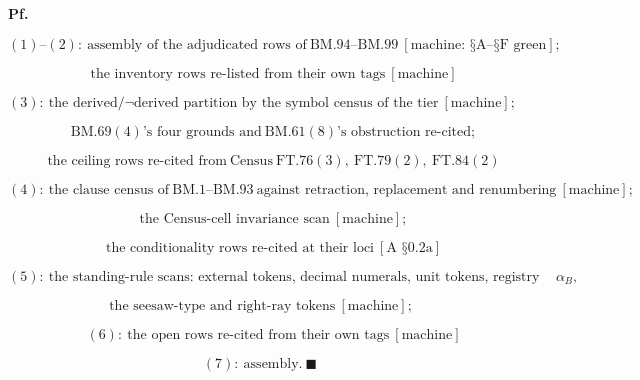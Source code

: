 \documentclass[11pt,openany]{report}
\theoremstyle{canonplain}
\theoremstyle{canondef}
\begin{document}
\textbf{Pf.}

\[
(1)\text{--}(2):\ \text{assembly of the adjudicated rows of}\ \mathrm{BM.94}\text{--}\mathrm{BM.99}\ [\text{machine: §A--§F green}];
\]

\[
\qquad \text{the inventory rows re-listed from their own tags}\ [\text{machine}]
\]

\[
(3):\ \text{the derived/}\neg\text{derived partition by the symbol census of the tier}\ [\text{machine}];
\]

\[
\qquad \mathrm{BM.69}(4)\text{'s four grounds and}\ \mathrm{BM.61}(8)\text{'s obstruction re-cited};
\]

\[
\qquad \text{the ceiling rows re-cited from}\ \mathrm{Census\ FT.76}(3),\ \mathrm{FT.79}(2),\ \mathrm{FT.84}(2)
\]

\[
(4):\ \text{the clause census of}\ \mathrm{BM.1}\text{--}\mathrm{BM.93}\ \text{against retraction, replacement and renumbering}\ [\text{machine}];
\]

\[
\qquad \text{the Census-cell invariance scan}\ [\text{machine}];
\]

\[
\qquad \text{the conditionality rows re-cited at their loci}\ [\text{A §0.2a}]
\]

\[
(5):\ \text{the standing-rule scans: external tokens, decimal numerals, unit tokens, registry tokens, declaration lines, the barred object}\ \alpha_B,
\]

\[
\ \text{the seesaw-type and right-ray tokens}\ [\text{machine}];
\]

\[
\qquad (6):\ \text{the open rows re-cited from their own tags}\ [\text{machine}]
\]

\[
(7):\ \text{assembly}.\ \blacksquare
\]
\end{document}
